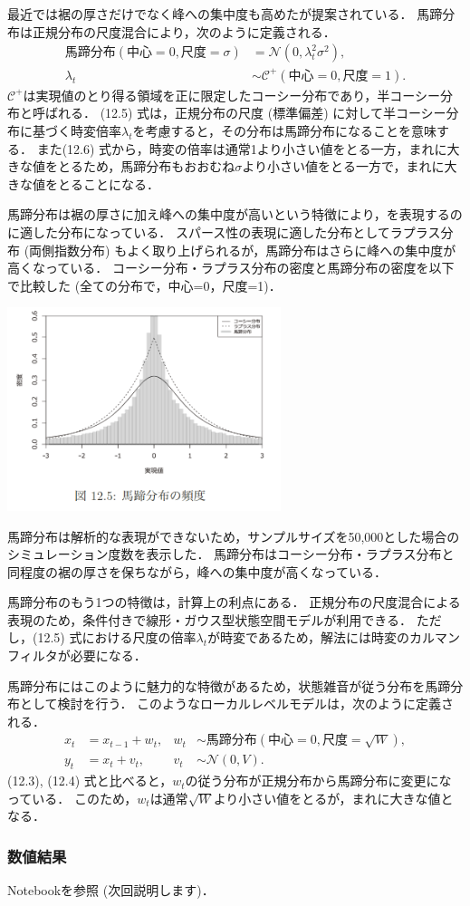 \documentclass[11pt,a4paper]{jsarticle}
\numberwithin{equation}{section}
\begin{document}
最近では裾の厚さだけでなく峰への集中度も高めたが提案されている．
馬蹄分布は正規分布の尺度混合により，次のように定義される．
\begin{align}
馬蹄分布(中心=0, 尺度=\sigma)
& =
\mathcal{N}(0, λ_t^2 \sigma^2), \\
λ_t
& \sim
\mathcal{C}^+(中心= 0, 尺度= 1).
\end{align}
$\mathcal{C}^+$は実現値のとり得る領域を正に限定したコーシー分布であり，半コーシー分布と呼ばれる．
(12.5) 式は，正規分布の尺度 (標準偏差) に対して半コーシー分布に基づく時変倍率$λ_t$を考慮すると，その分布は馬蹄分布になることを意味する．
また(12.6) 式から，時変の倍率は通常1より小さい値をとる一方，まれに大きな値をとるため，馬蹄分布もおおむね$\sigma$より小さい値をとる一方で，まれに大きな値をとることになる．

馬蹄分布は裾の厚さに加え峰への集中度が高いという特徴により，を表現するのに適した分布になっている．
スパース性の表現に適した分布としてラプラス分布 (両側指数分布) もよく取り上げられるが，馬蹄分布はさらに峰への集中度が高くなっている．
コーシー分布・ラプラス分布の密度と馬蹄分布の密度を以下で比較した (全ての分布で，中心=0，尺度=1)．
\begin{center}
\includegraphics[width=8cm]{img/Figure12_5.png}
\end{center}


馬蹄分布は解析的な表現ができないため，サンプルサイズを50,000とした場合のシミュレーション度数を表示した．
馬蹄分布はコーシー分布・ラプラス分布と同程度の裾の厚さを保ちながら，峰への集中度が高くなっている．

馬蹄分布のもう1つの特徴は，計算上の利点にある．
正規分布の尺度混合による表現のため，条件付きで線形・ガウス型状態空間モデルが利用できる．
ただし，(12.5) 式における尺度の倍率$λ_t$が時変であるため，解法には時変のカルマンフィルタが必要になる．

馬蹄分布にはこのように魅力的な特徴があるため，状態雑音が従う分布を馬蹄分布として検討を行う．
このようなローカルレベルモデルは，次のように定義される．
\begin{align}
x_t
& =
x_{t-1} + w_t, & w_t & \sim 馬蹄分布(中心=0, 尺度=\sqrt{W}), \\
y_t
& =
x_t + v_t, & v_t & \sim \mathcal{N} (0, V).
\end{align}
(12.3), (12.4) 式と比べると，$w_t$の従う分布が正規分布から馬蹄分布に変更になっている．
このため，$w_t$は通常$\sqrt{W}$より小さい値をとるが，まれに大きな値となる．

\subsubsection{数値結果}
Notebookを参照 (次回説明します)．
\end{document}
